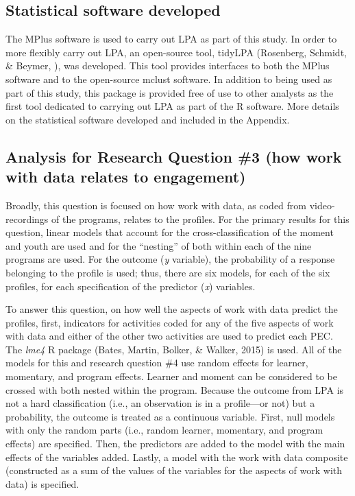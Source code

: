\documentclass[]{msu-thesis}
\theoremstyle{definition}
\theoremstyle{definition}
\theoremstyle{definition}
\theoremstyle{remark}
\begin{document}
\subsection{Statistical software
developed}\label{statistical-software-developed}

The MPlus software is used to carry out LPA as part of this study. In
order to more flexibly carry out LPA, an open-source tool, tidyLPA
(Rosenberg, Schmidt, \& Beymer, ), was developed. This tool provides
interfaces to both the MPlus software and to the open-source mclust
software. In addition to being used as part of this study, this package
is provided free of use to other analysts as the first tool dedicated to
carrying out LPA as part of the R software. More details on the
statistical software developed and included in the Appendix.

\subsection{Analysis for Research Question \#3 (how work with data
relates to
engagement)}\label{analysis-for-research-question-3-how-work-with-data-relates-to-engagement}

Broadly, this question is focused on how work with data, as coded from
video-recordings of the programs, relates to the profiles. For the
primary results for this question, linear models that account for the
cross-classification of the moment and youth are used and for the
``nesting'' of both within each of the nine programs are used. For the
outcome (\emph{y} variable), the probability of a response belonging to
the profile is used; thus, there are six models, for each of the six
profiles, for each specification of the predictor (\emph{x}) variables.

To answer this question, on how well the aspects of work with data
predict the profiles, first, indicators for activities coded for any of
the five aspects of work with data and either of the other two
activities are used to predict each PEC. The \emph{lme4} R package
(Bates, Martin, Bolker, \& Walker, 2015) is used. All of the models for
this and research question \#4 use random effects for learner,
momentary, and program effects. Learner and moment can be considered to
be crossed with both nested within the program. Because the outcome from
LPA is not a hard classification (i.e., an observation is in a
profile---or not) but a probability, the outcome is treated as a
continuous variable. First, null models with only the random parts
(i.e., random learner, momentary, and program effects) are specified.
Then, the predictors are added to the model with the main effects of the
variables added. Lastly, a model with the work with data composite
(constructed as a sum of the values of the variables for the aspects of
work with data) is specified.
\end{document}
